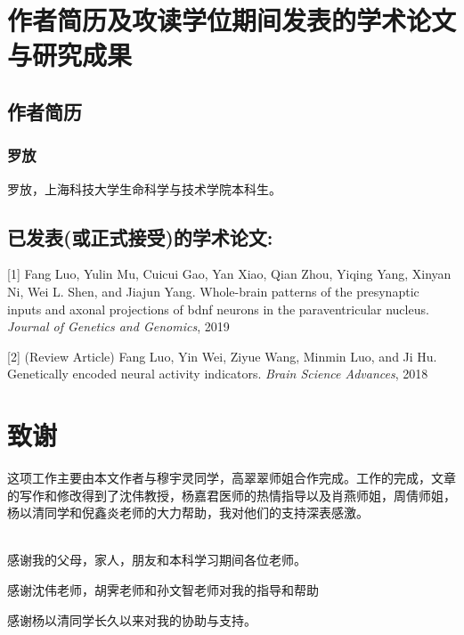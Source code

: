 \chapter{作者简历及攻读学位期间发表的学术论文与研究成果}

\section*{作者简历}

\subsection*{罗放}

罗放，上海科技大学生命科学与技术学院本科生。

\section*{已发表(或正式接受)的学术论文:}

[1] Fang Luo, Yulin Mu, Cuicui Gao, Yan Xiao, Qian Zhou, Yiqing Yang, Xinyan Ni, Wei L. Shen, and Jiajun Yang. Whole-brain patterns of the presynaptic inputs and axonal projections of bdnf neurons in the paraventricular nucleus. \textit{Journal of Genetics and Genomics}, 2019

[2] (Review Article) Fang Luo, Yin Wei, Ziyue Wang, Minmin Luo, and Ji Hu. Genetically encoded neural activity indicators. \textit{Brain Science Advances}, 2018




\chapter[致谢]{致\quad 谢}%
\thispagestyle{noheaderstyle}%



这项工作主要由本文作者与穆宇灵同学，高翠翠师姐合作完成。工作的完成，文章的写作和修改得到了沈伟教授，杨嘉君医师的热情指导以及肖燕师姐，周倩师姐，杨以清同学和倪鑫炎老师的大力帮助，我对他们的支持深表感激。\\\quad\\



\centering{}

感谢我的父母，家人，朋友和本科学习期间各位老师。

感谢沈伟老师，胡霁老师和孙文智老师对我的指导和帮助

感谢杨以清同学长久以来对我的协助与支持。


\cleardoublepage[plain]%

